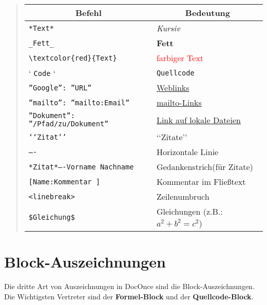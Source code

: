 \documentclass[%
oneside,                 %
final,                   %
chapterprefix=true,      %
open=right,              %
10pt]{book}
\begin{document}
\begin{quote}
\begin{tabular}{ll}
\hline
\multicolumn{1}{c}{ Befehl } & \multicolumn{1}{c}{ Bedeutung } \\
\hline
\texttt{*Text*}                               & \emph{Kursiv}                                                              \\
\Verb!_Fett_!                               & \textbf{Fett}                                                              \\
\Verb!\textcolor{red}{Text}!                & \textcolor{red}{farbiger Text}                                             \\
` \texttt{Code} `                             & \texttt{Quellcode}                                                           \\
\texttt{''Google'': ''URL''}                  & \href{{http://google.com}}{Weblinks}                                       \\
\texttt{''mailto'': ''mailto:Email'' }        & \href{{mailto:simon81186@aol.com}}{mailto-Links}                           \\
\texttt{''Dokument'': ''/Pfad/zu/Dokument'' } & \href{{/tools/manual.pdf}}{\textcolor{darkblue2}{Link auf lokale Dateien}} \\
\texttt{‘‘Zitat’’}                    & ‘‘Zitate’’                                                         \\
\texttt{----}                                 & Horizontale Linie                                                          \\
\texttt{*Zitat*----Vorname Nachname}          & Gedankenstrich(für Zitate)                                                \\
\texttt{[Name:Kommentar ]}                    & Kommentar im Fließtext                                                    \\
\texttt{<linebreak>}                          & Zeilenumbruch                                                              \\
\Verb!$Gleichung$!                          & Gleichungen (z.B.: $a^2 + b^2 = c^2$)                                      \\
\hline
\end{tabular}
\end{quote}

\noindent
\section{Block-Auszeichnungen}
Die dritte Art von Auszeichnungen in DocOnce sind die Block-Auszeichnungen. Die Wichtigsten Vertreter sind der \textbf{Formel-Block} und der \textbf{Quellcode-Block}.
\end{document}
